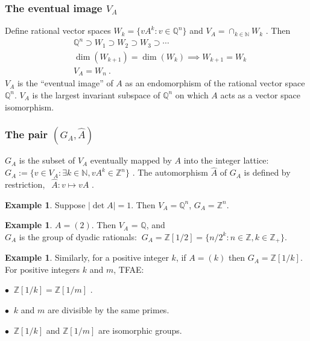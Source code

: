 \documentclass{amsart}
\theoremstyle{definition}
\newtheorem{ex}[equation]{Example}
\theoremstyle{definition}
\newcommand{\Z}{\mathbb Z}
\newcommand{\Q}{\mathbb Q}
\newcommand{\N}{\mathbb N}
\numberwithin{equation}{subsection}
\begin{document}
\subsubsection{The eventual image $V_A$}
      Define
   rational vector spaces
   $W_k = \{ vA^k: v \in \Q^n\}$ and
   $V_A = \cap_{k\in \N}  W_k$ .
   Then
\begin{align*}
& \Q^n \supset W_1 \supset W_{2}\supset W_3 \supset \cdots  \\
&\dim (W_{k+1})=\dim (W_k)\implies W_{k+1}=W_k \\
&   V_A = W_n \ .
\end{align*}
    $V_A$  is  the
   ``eventual image'' of $A$ as an endomorphism of the rational
   vector space $\Q^n$.
   $V_A$ is the largest invariant subspace of $\Q^n$ on which $A$ acts as
   a vector space isomorphism.

\subsubsection{The pair $(G_A, \hat A)$}

 $G_A$ is the subset of $V_A$ eventually mapped by $A$ into
      the integer lattice:
 $G_A := \{ v\in V_A: \exists k\in \N , vA^k \in \Z^n\}$ .
      The automorphism $\hat A$ of $G_A$ is defined by
restriction,
$\ \    \hat A : v\mapsto vA $ .

\begin{ex}  Suppose $|\det A| =1$. Then $V_A= \Q^n$, $G_A = \Z^n$.
\end{ex}
\begin{ex}
$A = (2)$.
Then
$V_A$ = $\Q$, and \\
$G_A$ is the group of dyadic rationals:
$\ G_A = \Z[1/2] = \{ n/2^{k}: n\in \Z, k \in \Z_+\}$.
\end{ex}
\begin{ex} Similarly, for a positive integer $k$, if $A=(k)$ then
$G_A = \Z [1/k]$.
For positive integers $k$ and $ m$, TFAE:

$\bullet \ $ $ \Z [1/k] = \Z [1/m]$ .

$\bullet \ $ $ k$ and $m$ are divisible by the same primes.

$\bullet \ $ $ \Z [1/k]$ and $ \Z [1/m]$ are isomorphic groups.
\end{ex}
\end{document}
